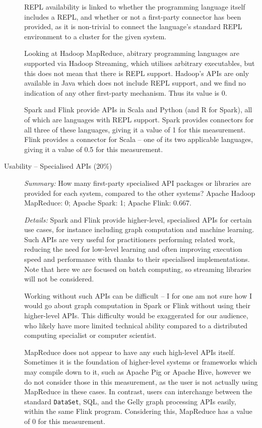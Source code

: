 \begin{description}
      REPL availability is linked to whether the programming language itself includes a REPL, and whether or not a first-party connector has been provided, as it is non-trivial to connect the language's standard REPL environment to a cluster for the given system.
      
      Looking at Hadoop MapReduce, abitrary programming languages are supported via Hadoop Streaming, which utilises arbitrary executables, but this does not mean that there is REPL support. Hadoop's APIs are only available in Java which does not include REPL support, and we find no indication of any other first-party mechanism. Thus its value is 0.
      
      Spark and Flink provide APIs in Scala and Python (and R for Spark), all of which are languages with REPL support. Spark provides connectors for all three of these languages, giving it a value of 1 for this measurement. Flink provides a connector for Scala -- one of its two applicable languages, giving it a value of 0.5 for this measurement.

    \item[Usability -- Specialised APIs (20\%)]
      \textit{Summary:} How many first-party specialised API packages or libraries are provided for each system, compared to the other systems? Apache Hadoop MapReduce: 0; Apache Spark: 1; Apache Flink: 0.667.\medskip

      \textit{Details:} Spark and Flink provide higher-level, specialised APIs for certain use cases, for instance including graph computation and machine learning. Such APIs are very useful for practitioners performing related work, reducing the need for low-level learning and often improving execution speed and performance with thanks to their specialised implementations. Note that here we are focused on batch computing, so streaming libraries will not be considered.

      Working without such APIs can be difficult -- I for one am not sure how I would go about graph computation in Spark or Flink without using their higher-level APIs. This difficulty would be exaggerated for our audience, who likely have more limited technical ability compared to a distributed computing specialist or computer scientist.

      MapReduce does not appear to have any such high-level APIs itself. Sometimes it is the foundation of higher-level systems or frameworks which may compile down to it, such as Apache Pig or Apache Hive, however we do not consider those in this measurement, as the user is not actually using MapReduce in these cases. In contrast, users can interchange between the standard \texttt{DataSet}, SQL, and the Gelly graph processing APIs easily, within the same Flink program. Considering this, MapReduce has a value of 0 for this measurement.


\end{description}
